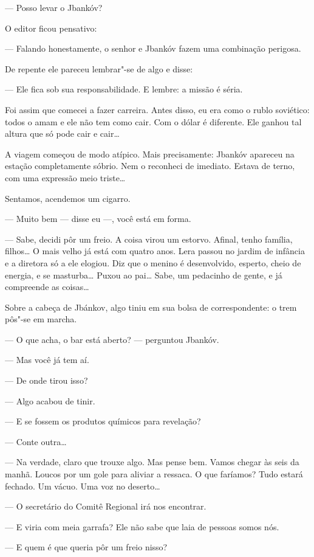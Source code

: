 --- Posso levar o Jbankóv?

O editor ficou pensativo:

--- Falando honestamente, o senhor e Jbankóv fazem uma combinação
perigosa.

De repente ele pareceu lembrar"-se de algo e disse:

--- Ele fica sob sua responsabilidade. E lembre: a missão é
séria.

Foi assim que comecei a fazer carreira. Antes disso, eu era como o rublo
soviético: todos o amam e ele não tem como cair. Com o dólar é
diferente. Ele ganhou tal altura que só pode cair e cair\ldots{}

A viagem começou de modo atípico. Mais precisamente: Jbankóv apareceu na
estação completamente sóbrio. Nem o reconheci de imediato. Estava de
terno, com uma expressão meio triste\ldots{}

Sentamos, acendemos um cigarro.

--- Muito bem --- disse eu ---, você está em forma.

--- Sabe, decidi pôr um freio. A coisa virou um estorvo. Afinal,
tenho família, filhos\ldots{} O mais velho já está com quatro anos. Lera
passou no jardim de infância e a diretora só a ele elogiou. Diz que o
menino é desenvolvido, esperto, cheio de energia, e se masturba\ldots{} Puxou
ao pai\ldots{} Sabe, um pedacinho de gente, e já compreende as coisas\ldots{}

Sobre a cabeça de Jbánkov, algo tiniu em sua bolsa de correspondente: o
trem pôs"-se em marcha.

--- O que acha, o bar está aberto? --- perguntou Jbankóv.

--- Mas você já tem aí.

--- De onde tirou isso?

--- Algo acabou de tinir.

--- E se fossem os produtos químicos para revelação?

--- Conte outra\ldots{}

--- Na verdade, claro que trouxe algo. Mas pense bem. Vamos
chegar às seis da manhã. Loucos por um gole para aliviar a ressaca. O
que faríamos? Tudo estará fechado. Um vácuo. Uma voz no deserto\ldots{}

--- O secretário do Comitê Regional irá nos encontrar.

--- E viria com meia garrafa? Ele não sabe que laia de pessoas
somos nós.

--- E quem é que queria pôr um freio nisso?

